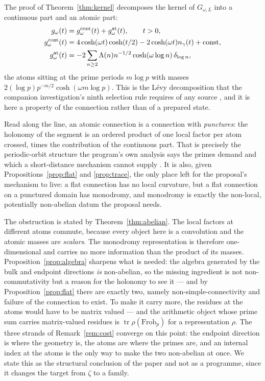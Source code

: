 The proof of Theorem~\ref{thm:kernel} decomposes the kernel of $G_{\omega,L}$
into a continuous part and an atomic part:
\begin{equation}\label{eq:atomic}
\begin{aligned}
 g_\omega(t)&=g_\omega^{\rm cont}(t)+g_\omega^{\rm at}(t),\qquad t>0,\\
 g_\omega^{\rm cont}(t)&=4\cosh(\omega t)\cosh(t/2)
   -2\cosh(\omega t)n_{\gamma}(t)+\mathrm{const},\\
 g_\omega^{\rm at}(t)&=-2\sum_{n\geq2}\Lambda(n)n^{-1/2}
   \cosh(\omega\log n)\,\delta_{\log n},
\end{aligned}
\end{equation}
the atoms sitting at the prime periods $m\log p$ with masses
$2(\log p)p^{-m/2}\cosh(\omega m\log p)$. This is the L\'evy decomposition that
the companion investigation's ninth selection rule requires of any source
\cite{Selection}, and it is here a property of the connection rather than of a
prepared state.

Read along the line, an atomic connection is a connection with \emph{punctures}:
the holonomy of the segment is an ordered product of one local factor per atom
crossed, times the contribution of the continuous part. That is precisely the
periodic-orbit structure the program's own analysis says the primes demand and
which a short-distance mechanism cannot supply \cite{Bottleneck}. It is also,
given Propositions~\ref{prop:flat} and \ref{prop:trace}, the only place left for
the proposal's mechanism to live: a flat connection has no local curvature, but a
flat connection on a punctured domain has monodromy, and monodromy is exactly the
non-local, potentially non-abelian datum the proposal needs.

The obstruction is stated by Theorem~\ref{thm:abelian}. The local factors at
different atoms commute, because every object here is a convolution and the
atomic masses are \emph{scalars}. The monodromy representation is therefore
one-dimensional and carries no more information than the product of its masses.
Proposition~\ref{prop:algebra} sharpens what is needed: the algebra generated by
the bulk and endpoint directions \emph{is} non-abelian, so the missing ingredient
is not non-commutativity but a reason for the holonomy to see it --- and by
Proposition~\ref{prop:flat} there are exactly two, namely non-simple-connectivity
and failure of the connection to exist.
To make it carry more, the residues at the atoms would have to be matrix valued
--- and the arithmetic object whose prime sum carries matrix-valued residues is
$\operatorname{tr}\rho(\mathrm{Frob}_p)$ for a representation $\rho$. The three
strands of Remark~\ref{rem:cost} converge on this point: the endpoint direction
is where the geometry is, the atoms are where the primes are, and an internal
index at the atoms is the only way to make the two non-abelian at once. We state
this as the structural conclusion of the paper and not as a programme, since it
changes the target from $\zeta$ to a family.


